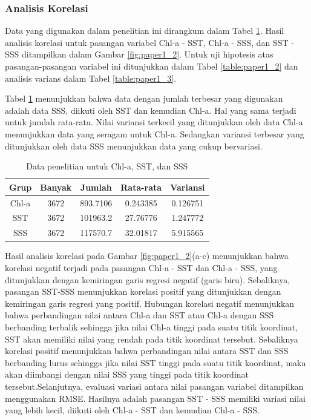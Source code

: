 \begin{spacing}{1.5}
\subsubsection[Analisis Korelasi]{Analisis Korelasi}
	
	Data yang digunakan dalam penelitian ini dirangkum dalam Tabel \ref{table:paper1_1}. Hasil analisis korelasi untuk pasangan variabel Chl-a - SST, Chl-a - SSS, dan SST - SSS ditampilkan dalam Gambar \ref{fig:paper1_2}. Untuk uji hipotesis atas pasangan-pasangan variabel ini ditunjukkan dalam Tabel \ref{table:paper1_2} dan analisis varians dalam Tabel \ref{table:paper1_3}.
	
	Tabel \ref{table:paper1_1} menunjukkan bahwa data dengan jumlah terbesar yang digunakan adalah data SSS, diikuti oleh SST dan kemudian Chl-a. Hal yang sama terjadi untuk jumlah rata-rata. Nilai variansi terkecil yang ditunjukkan oleh data Chl-a menunjukkan data yang seragam untuk Chl-a. Sedangkan variansi terbesar yang ditunjukkan oleh data SSS menunjukkan data yang cukup bervariasi.
	
	\begin{table}[H]
		\centering
		\caption{Data penelitian untuk Chl-a, SST, dan SSS}
		\label{table:paper1_1}
		\begin{tabular}{|c|c|c|c|c|}
			\hline
			Grup  & Banyak & Jumlah   & Rata-rata & Variansi \\ \hline
			Chl-a & 3672   & 893.7106 & 0.243385  & 0.126751 \\ \hline
			SST   & 3672   & 101963.2 & 27.76776  & 1.247772 \\ \hline
			SSS   & 3672   & 117570.7 & 32.01817  & 5.915565 \\ \hline
		\end{tabular}
	\end{table}

	Hasil analisis korelasi pada Gambar \ref{fig:paper1_2}(a-c) menunjukkan bahwa korelasi negatif terjadi pada pasangan Chl-a - SST dan Chl-a - SSS, yang ditunjukkan dengan kemiringan garis regresi negatif (garis biru). Sebaliknya, pasangan SST-SSS menunjukkan korelasi positif yang ditunjukkan dengan kemiringan garis regresi yang positif. Hubungan korelasi negatif menunjukkan bahwa perbandingan nilai antara Chl-a dan SST atau Chl-a dengan SSS berbanding terbalik sehingga jika nilai Chl-a tinggi pada suatu titik koordinat, SST akan memiliki nilai yang rendah pada titik koordinat tersebut. Sebaliknya korelasi positif menunjukkan bahwa perbandingan nilai antara SST dan SSS berbanding lurus sehingga jika nilai SST tinggi pada suatu titik koordinat, maka akan diimbangi dengan nilai SSS yang tinggi pada titik koordinat tersebut.Selanjutnya, evaluasi variasi antara nilai pasangan variabel ditampilkan menggunakan RMSE. Hasilnya adalah pasangan SST - SSS memiliki variasi nilai yang lebih kecil, diikuti oleh Chl-a - SST dan kemudian Chl-a - SSS.
	

\end{spacing}
